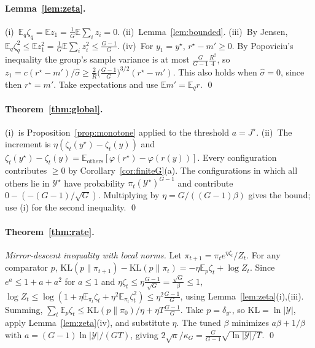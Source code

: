 \documentclass[11pt]{article}
\theoremstyle{definition}
\theoremstyle{remark}
\newcommand{\E}{\mathbb{E}}
\newcommand{\KL}{\mathrm{KL}}
\newcommand{\cY}{\mathcal{Y}}
\newcommand{\1}{\mathbb{1}}
\begin{document}
\paragraph{Lemma~\ref{lem:zeta}.} (i)~$\E_q\zeta_q=\E z_1=\frac1G\E\sum_iz_i=0$.
(ii)~Lemma~\ref{lem:bounded}. (iii)~By Jensen,
$\E_q\zeta_q^2\le\E z_1^2=\frac1G\E\sum_iz_i^2\le\frac{G-1}{G}$. (iv)~For $y_1=y^\star$,
$r^\star-m'\ge0$. By Popoviciu's inequality the group's sample variance is at most
$\frac{G}{G-1}\frac{R^2}{4}$, so
$z_1=c(r^\star-m')/\hat\sigma\ge\frac{2}{R}\bigl(\frac{G-1}{G}\bigr)^{3/2}(r^\star-m')$. This also
holds when $\hat\sigma=0$, since then $r^\star=m'$. Take expectations and use
$\E m'=\E_qr$. \qed

\paragraph{Theorem~\ref{thm:global}.} (i)~is Proposition~\ref{prop:monotone} applied to
the threshold $a=J^\star$. (ii)~The increment is $\eta(\zeta_t(y^\star)-\zeta_t(y))$ and
$\zeta_t(y^\star)-\zeta_t(y)=\E_{\mathrm{others}}[\varphi(r^\star)-\varphi(r(y))]$. Every
configuration contributes $\ge0$ by Corollary~\ref{cor:finiteG}(a). The configurations in
which all others lie in $\cY^\star$ have probability $\pi_t(\cY^\star)^{G-1}$ and contribute
$0-(-(G-1)/\sqrt G)$. Multiplying by $\eta=G/((G-1)\beta)$ gives the bound; use (i) for the
second inequality. \qed

\paragraph{Theorem~\ref{thm:rate}.} \emph{Mirror-descent inequality with local norms.} Let
$\pi_{t+1}=\pi_te^{\eta\zeta_t}/Z_t$. For any comparator $p$,
$\KL(p\|\pi_{t+1})-\KL(p\|\pi_t)=-\eta\E_p\zeta_t+\log Z_t$. Since $e^a\le1+a+a^2$ for
$a\le1$ and $\eta\zeta_t\le\eta\frac{G-1}{\sqrt G}=\frac{\sqrt G}{\beta}\le1$,
$\log Z_t\le\log(1+\eta\E_{\pi_t}\zeta_t+\eta^2\E_{\pi_t}\zeta_t^2)\le\eta^2\frac{G-1}{G}$,
using Lemma~\ref{lem:zeta}(i),(iii). Summing,
$\sum_t\E_p\zeta_t\le\KL(p\|\pi_0)/\eta+\eta T\frac{G-1}{G}$. Take $p=\delta_{y^\star}$, so
$\KL=\ln|\cY|$, apply Lemma~\ref{lem:zeta}(iv), and substitute $\eta$. The tuned $\beta$
minimizes $a\beta+1/\beta$ with $a=(G-1)\ln|\cY|/(GT)$, giving
$2\sqrt a/\kappa_G=\frac{G}{G-1}\sqrt{\ln|\cY|/T}$. \qed
\end{document}
